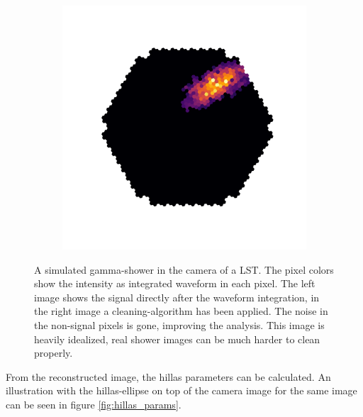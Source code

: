\begin{figure}
\begin{subfigure}{.4\textwidth}
		\includegraphics[width=\linewidth]{Plots/hillas_cleaned.pdf}
	\end{subfigure}
	\caption{A simulated gamma-shower in the camera of a LST.
		The pixel colors show the intensity as integrated 
		waveform in each pixel. The left image 
		shows the signal directly after
		the waveform integration, in the right image
		a cleaning-algorithm has been 
		applied. The noise in the non-signal pixels is gone,
		improving the analysis.
		This image is heavily idealized, real shower images 
		can be much harder to clean properly.}
	\label{fig:shower_cleaning}
\end{figure}

From the reconstructed image, the hillas parameters can be calculated.
An illustration with the hillas-ellipse on top of the camera image 
for the same image can be seen in figure \ref{fig:hillas_params}.

